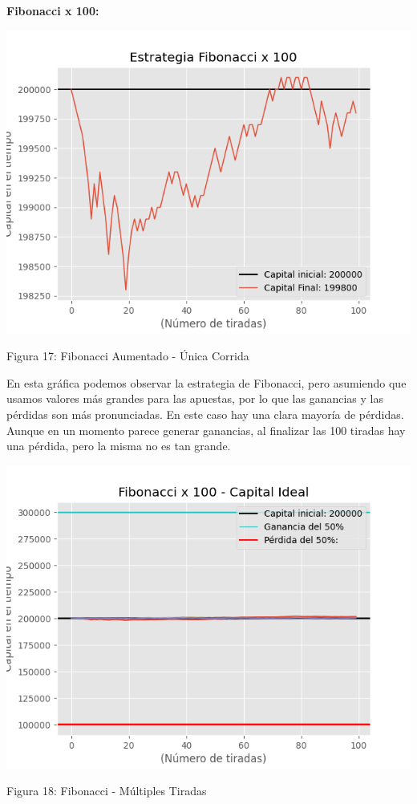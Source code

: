 \documentclass{article}
\begin{document}
\textbf{Fibonacci x 100:}

\begin{center}
    \includegraphics[width=0.7\linewidth]{FIBx100-ideal-1tirada.png}
    
    \caption{Figura 17: Fibonacci Aumentado - Única Corrida}
\end{center}

En esta gráfica podemos observar la estrategia de Fibonacci, pero asumiendo que usamos valores más grandes para las apuestas, por lo que las ganancias y las pérdidas son más pronunciadas. En este caso hay una clara mayoría de pérdidas. Aunque en un momento parece generar ganancias, al finalizar las 100 tiradas hay una pérdida, pero la misma no es tan grande.

\begin{center}
    \includegraphics[width=0.7\linewidth]{FIBx100-ideal-multiplestiradas(1).png}
    
    \caption{Figura 18: Fibonacci - Múltiples Tiradas}
\end{center}
\end{document}
